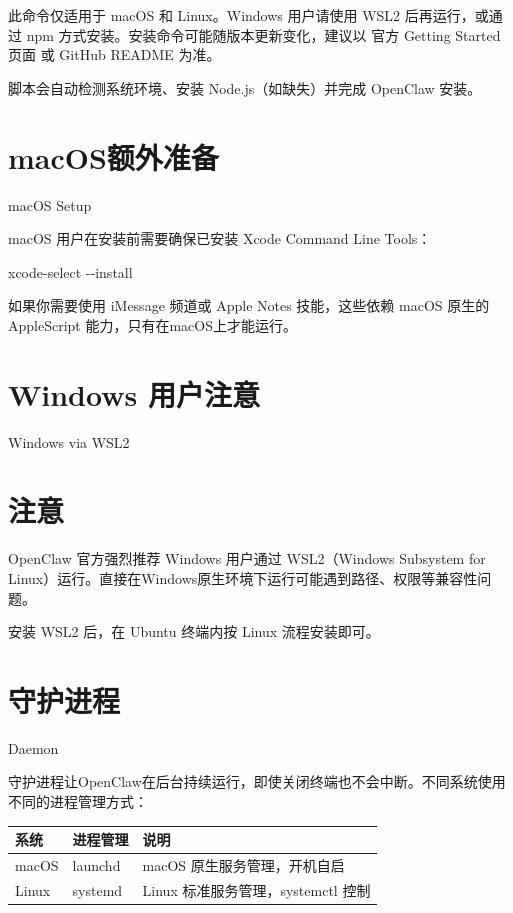\documentclass[
  10
]{article}
\newenvironment{Shaded}{}{}
\newcommand{\NormalTok}[1]{#1}
\newcounter{none} %
\begin{document}
此命令仅适用于 macOS 和 Linux。Windows 用户请使用 WSL2 后再运行，或通过
npm 方式安装。安装命令可能随版本更新变化，建议以 官方 Getting Started
页面 或 GitHub README 为准。

脚本会自动检测系统环境、安装 Node.js（如缺失）并完成 OpenClaw 安装。

\section{macOS额外准备}\label{macosux989dux5916ux51c6ux5907}

macOS Setup

macOS 用户在安装前需要确保已安装 Xcode Command Line Tools：

\begin{Shaded}
\begin{Highlighting}[]
\NormalTok{xcode{-}select {-}{-}install}
\end{Highlighting}
\end{Shaded}

如果你需要使用 iMessage 频道或 Apple Notes 技能，这些依赖 macOS 原生的
AppleScript 能力，只有在macOS上才能运行。

\section{Windows 用户注意}\label{windows-ux7528ux6237ux6ce8ux610f}

Windows via WSL2

\section{注意}\label{ux6ce8ux610f-3}

OpenClaw 官方强烈推荐 Windows 用户通过 WSL2（Windows Subsystem for
Linux）运行。直接在Windows原生环境下运行可能遇到路径、权限等兼容性问题。

安装 WSL2 后，在 Ubuntu 终端内按 Linux 流程安装即可。

\section{守护进程}\label{ux5b88ux62a4ux8fdbux7a0b}

Daemon

守护进程让OpenClaw在后台持续运行，即使关闭终端也不会中断。不同系统使用不同的进程管理方式：

{\def\LTcaptype{none} %
\begin{longtable}[]{@{}|l|l|l|@{}}
\toprule\noalign{}
\endhead
\bottomrule\noalign{}
\endlastfoot
\hline
系统 & 进程管理 & 说明 \\
\hline
macOS & launchd & macOS 原生服务管理，开机自启 \\
\hline
Linux & systemd & Linux 标准服务管理，systemctl 控制 \\
\hline
\end{longtable}
}
\end{document}

